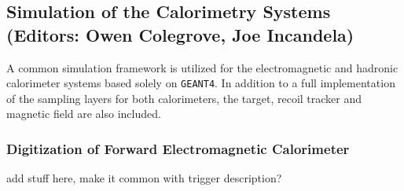 
\subsection{Simulation of the Calorimetry Systems (Editors: Owen Colegrove, Joe Incandela)}

A common simulation framework is utilized for the electromagnetic and hadronic calorimeter systems based solely on {\tt GEANT4}.
In addition to a full implementation of the sampling layers for both calorimeters, the target, recoil tracker and magnetic field are also included.

\subsubsection{Digitization of Forward Electromagnetic Calorimeter}

{\color{red} add stuff here, make it common with trigger description? }